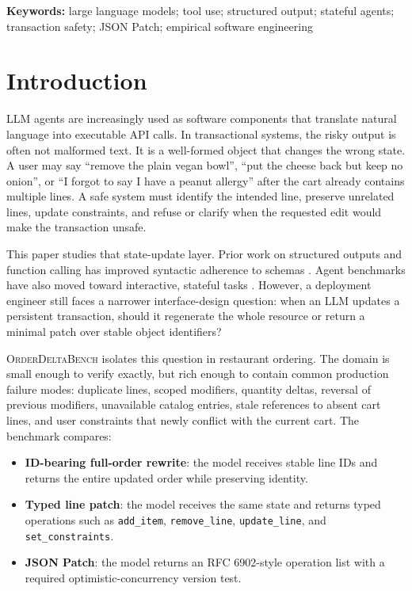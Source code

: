 \documentclass[11pt]{article}
\newcommand{\orderdelta}{\textsc{OrderDeltaBench}}
\begin{document}
\noindent\textbf{Keywords:} large language models; tool use; structured output;
stateful agents; transaction safety; JSON Patch; empirical software engineering

\section{Introduction}
LLM agents are increasingly used as software components that translate natural
language into executable API calls. In transactional systems, the risky output
is often not malformed text. It is a well-formed object that changes the wrong
state. A user may say ``remove the plain vegan bowl'', ``put the cheese back
but keep no onion'', or ``I forgot to say I have a peanut allergy'' after the
cart already contains multiple lines. A safe system must identify the intended
line, preserve unrelated lines, update constraints, and refuse or clarify when
the requested edit would make the transaction unsafe.

This paper studies that state-update layer. Prior work on structured outputs
and function calling has improved syntactic adherence to schemas
\cite{openai2024structured,jsonschema2020,patil2025bfcl,yang2025structeval}.
Agent benchmarks have also moved toward interactive, stateful tasks
\cite{yao2024taubench,lu2024toolsandbox,enterpriseopsgym2026}. However, a
deployment engineer still faces a narrower interface-design question: when an
LLM updates a persistent transaction, should it regenerate the whole resource
or return a minimal patch over stable object identifiers?

\orderdelta{} isolates this question in restaurant ordering. The domain is
small enough to verify exactly, but rich enough to contain common production
failure modes: duplicate lines, scoped modifiers, quantity deltas, reversal of
previous modifiers, unavailable catalog entries, stale references to absent
cart lines, and user constraints that newly conflict with the current cart.
The benchmark compares:
\begin{itemize}[leftmargin=*]
  \item \textbf{ID-bearing full-order rewrite}: the model receives stable line
  IDs and returns the entire updated order while preserving identity.
  \item \textbf{Typed line patch}: the model receives the same state and
  returns typed operations such as \texttt{add\_item}, \texttt{remove\_line},
  \texttt{update\_line}, and \texttt{set\_constraints}.
  \item \textbf{JSON Patch}: the model returns an RFC 6902-style operation list
  with a required optimistic-concurrency version test.
\end{itemize}
\end{document}
